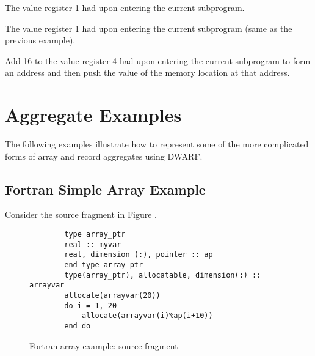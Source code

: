 \begin{description}
\descriptionitemnl{\DWOPentryvalue{} 1 \DWOPregone{} \DWOPstackvalue }
The value register 1 had upon entering the current subprogram.

\descriptionitemnl{\DWOPentryvalue{} 2 \DWOPbregone{} 0 \DWOPstackvalue }
The value register 1 had upon entering the current subprogram (same as the previous example).


\descriptionitemnl{\DWOPentryvalue{} 3 \DWOPbregfour{} 16 \DWOPderef{} \DWOPstackvalue }
Add 16 to the value register 4 had upon entering the current subprogram
to form an address and then push the value of the memory location at that address.

\end{description}

\clearpage
\section{Aggregate Examples}
\label{app:aggregateexamples}

The following examples illustrate how to represent some of
the more complicated forms of array and record aggregates
using DWARF.

\subsection{Fortran Simple Array Example}
\label{app:fortranarrayexample}
Consider the  source fragment in 
Figure .

\begin{figure}[h]
\begin{lstlisting}
        type array_ptr
        real :: myvar
        real, dimension (:), pointer :: ap
        end type array_ptr
        type(array_ptr), allocatable, dimension(:) :: arrayvar
        allocate(arrayvar(20))
        do i = 1, 20
            allocate(arrayvar(i)%ap(i+10))
        end do
\end{lstlisting}
\caption{Fortran array example: source fragment} 
\label{fig:fortranarrayexamplesourcefragment}
\end{figure}

